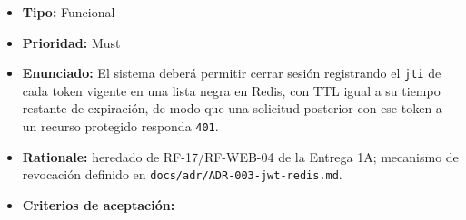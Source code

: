 \documentclass[
  spanish,
]{article}
\providecommand{\tightlist}{%
  \setlength{\itemsep}{0pt}\setlength{\parskip}{0pt}}
\begin{document}
\begin{itemize}
\tightlist
\item
  \textbf{Tipo:} Funcional
\item
  \textbf{Prioridad:} Must
\item
  \textbf{Enunciado:} El sistema deberá permitir cerrar sesión
  registrando el \texttt{jti} de cada token vigente en una lista negra
  en Redis, con TTL igual a su tiempo restante de expiración, de modo
  que una solicitud posterior con ese token a un recurso protegido
  responda \texttt{401}.
\item
  \textbf{Rationale:} heredado de RF-17/RF-WEB-04 de la Entrega 1A;
  mecanismo de revocación definido en
  \texttt{docs/\allowbreak{}adr/\allowbreak{}ADR-\allowbreak{}003-\allowbreak{}jwt-\allowbreak{}redis.\allowbreak{}md}.
\item
  \textbf{Criterios de aceptación:}


\end{itemize}
\end{document}
